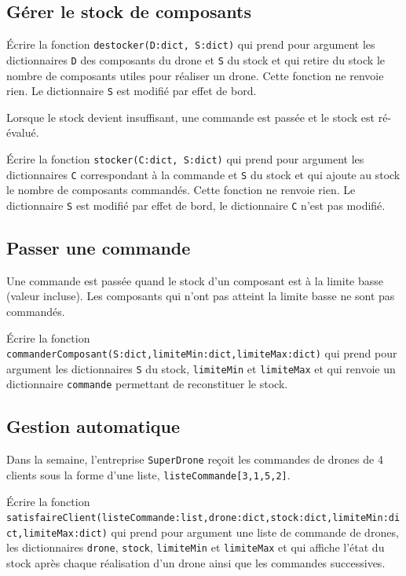 \subsection*{Gérer le stock de composants}

\begin{question}
\'Ecrire la fonction \lstinline{destocker(D:dict, S:dict)} qui prend pour argument les dictionnaires \lstinline{D} des composants du drone et \lstinline{S} du stock et qui retire du stock le nombre de composants utiles pour réaliser un drone. Cette fonction ne renvoie rien. Le dictionnaire \lstinline{S} est modifié par effet de bord.
\end{question}

\bigskip

Lorsque le stock devient insuffisant, une commande est passée et le stock est ré-évalué.

\begin{question}
\'Ecrire la fonction \lstinline{stocker(C:dict, S:dict)} qui prend pour argument les dictionnaires \lstinline{C} correspondant à la commande et \lstinline{S} du stock et qui ajoute au stock le nombre de composants commandés. Cette fonction ne renvoie rien. Le dictionnaire \lstinline{S} est modifié par effet de bord, le dictionnaire \lstinline{C} n'est pas modifié.
\end{question}

\subsection*{Passer une commande}
Une commande est passée quand le stock d'un composant est à la limite basse (valeur incluse). Les composants qui n'ont pas atteint la limite basse ne sont pas commandés.

\begin{question}
\'Ecrire la fonction \lstinline{commanderComposant(S:dict,limiteMin:dict,limiteMax:dict)} qui prend pour argument les dictionnaires \lstinline{S} du stock, \lstinline{limiteMin} et \lstinline{limiteMax} et qui renvoie un dictionnaire \lstinline{commande} permettant de reconstituer le stock.
\end{question}

\subsection*{Gestion automatique}
Dans la semaine, l'entreprise \lstinline{SuperDrone} reçoit les commandes de drones de 4 clients sous la forme d'une liste, \lstinline{listeCommande[3,1,5,2]}.

\begin{question}
\'Ecrire la fonction \lstinline{satisfaireClient(listeCommande:list,drone:dict,stock:dict,limiteMin:dict,limiteMax:dict)} qui prend pour argument une liste de commande de drones, les dictionnaires \lstinline{drone}, \lstinline{stock}, \lstinline{limiteMin} et \lstinline{limiteMax} et qui affiche l'état du stock après chaque réalisation d'un drone ainsi que les commandes successives.
\end{question}

